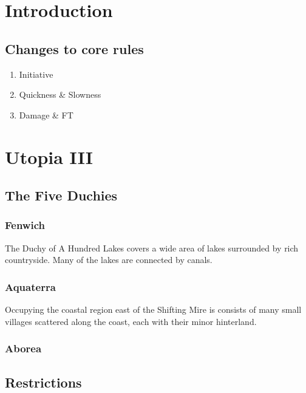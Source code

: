 \documentclass{report}
\begin{document}
\chapter{Introduction}

\section{Changes to core rules}

\begin{enumerate}
\item Initiative
\item Quickness \& Slowness
\item Damage \& FT
\end{enumerate}

\chapter{Utopia III}

\section{The Five Duchies}

\subsection{Fenwich}

The Duchy of A Hundred Lakes covers a wide area of lakes surrounded by
rich countryside.  Many of the lakes are connected by canals.

\subsection{Aquaterra}

Occupying the coastal region east of the Shifting Mire is consists of
many small villages scattered along the coast, each with their minor
hinterland.

\subsection{Aborea}





\section{Restrictions}
\end{document}
